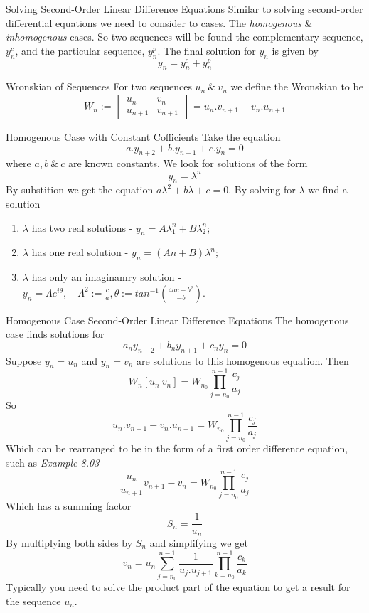 \documentclass[11pt,a4paper]{article}
\begin{document}
\subtitle{Remark 8.06 - }{Solving Second-Order Linear Difference Equations}
Similar to solving second-order differential equations we need to consider to cases. The \textit{homogenous} \& \textit{inhomogenous} cases.
So two sequences will be found the complementary sequence, $y_n^c$, and the particular sequence, $y_n^p$. The final solution for $y_n$ is given by $$y_n = y_n^c + y_n^p$$

\subtitle{Definition 8.07 - }{Wronskian of Sequences}
For two sequences $u_n\ \&\ v_n$ we define the Wronskian to be $$W_n := \begin{vmatrix} u_n & v_n \\ u_{n+1} & v_{n+1} \end{vmatrix} = u_n.v_{n+1} - v_n.u_{n+1}$$

\subtitle{Theorem 8.08 - }{Homogenous Case with Constant Cofficients}
Take the equation
$$a.y_{n+2} + b.y_{n+1} + c.y_n = 0$$
where $a, b\ \&\ c$ are known constants. We look for solutions of the form
$$y_n = \lambda^n$$
By substition we get the equation $a\lambda^2 + b\lambda + c = 0$. By solving for $\lambda$ we find a solution
\begin{enumerate}[label=\roman*)]
  \item $\lambda$ has two real solutions - $y_n = A\lambda_1^n + B\lambda_2^n$;
  \item $\lambda$ has one real solution - $y_n = (An + B)\lambda^n$;
  \item $\lambda$ has only an imaginamry solution - $y_n = \Lambda e^{i\theta},\quad \Lambda^2 := \frac{c}{a}, \theta := tan^{-1}(\frac{4ac - b^2}{-b})$.\\
\end{enumerate}

\subtitle{Theorem 8.09 - }{Homogenous Case Second-Order Linear Difference Equations}
The homogenous case finds solutions for $$a_ny_{n+2} + b_ny_{n+1} + c_ny_n = 0$$
Suppose $y_n = u_n$ and $y_n = v_n$ are solutions to this homogenous equation. Then $$W_n [u_n\ v_n] = W_{n_0}\prod_{j=n_0}^{n-1} \frac{c_j}{a_j}$$
So $$ u_n.v_{n+1} - v_n.u_{n+1} = W_{n_0}\prod_{j=n_0}^{n-1} \frac{c_j}{a_j}$$
Which can be rearranged to be in the form of a first order difference equation, such as \textit{Example 8.03}
$$\frac{u_n}{u_{n+1}}v_{n+1} - v_n = W_{n_0}\prod_{j=n_0}^{n-1} \frac{c_j}{a_j}$$
Which has a summing factor $$S_n = \frac{1}{u_n}$$
By multiplying both sides by $S_n$ and simplifying we get
$$v_n = u_n \sum_{j=n_0}^{n-1} \frac{1}{u_j.u_{j+1}} \prod_{k=n_0}^{n-1} \frac{c_k}{a_k}$$
Typically you need to solve the product part of the equation to get a result for the sequence $u_n$. \\
\end{document}
